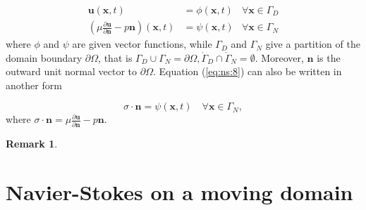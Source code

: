 \documentclass[a4paper,11pt,oneside]{book}
\newtheorem*{remark}{Remark}
\begin{document}
\begin{align}
\mathbf{u}(\mathbf{x},t) &= \phi (\mathbf{x}, t) & \forall \mathbf{x} \in \Gamma_D \\
\label{eq:ns:8}
\left( \mu \frac{\partial \mathbf{u}}{\partial \mathbf{n}} - p\mathbf{n} \right) (\mathbf{x},t) &= \psi(\mathbf{x},t) & \forall \mathbf{x} \in \Gamma_N
\end{align}
where $\phi$ and $\psi$ are given vector functions, while $\Gamma_D$ and $\Gamma_N$ give a partition of the domain boundary $\partial \Omega$, that is $\Gamma_D 	\cup \Gamma_N = \partial \Omega, \mathring{\Gamma}_D \cap \mathring{\Gamma}_N = \emptyset$. Moreover, $\mathbf{n}$ is the outward unit normal vector to $\partial \Omega$. Equation (\ref{eq:ns:8}) can also be written in another form

\begin{equation}
\sigma \cdot \mathbf{n} = \psi(\mathbf{x}, t)  \quad \forall \mathbf{x} \in \Gamma_N,
\end{equation}
where $ \sigma \cdot \mathbf{n} =  \mu \frac{\partial \mathbf{u}}{\partial \mathbf{n}} - p\mathbf{n} $.

\begin{remark}
\end{remark}


\section{Navier-Stokes on a moving domain}
\end{document}
